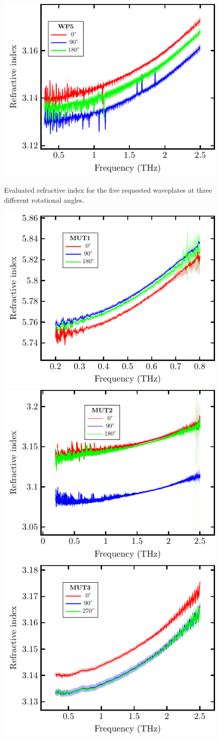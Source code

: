 \begin{figure}[H]
\subcaptionbox{\label{fig:ceramic_WP5}}
    {\includegraphics[width=0.45\linewidth]{images/7_appendix/plots/real/WP5.pdf}}
\caption{Evaluated refractive index for the five requested waveplates at three different rotational angles.}
\label{fig:ceramic_WPs}
\end{figure}

\begin{figure}[H]
\centering
\subcaptionbox{\label{fig:ceramic_MUT1}}
    {\hspace*{-2em}\includegraphics[width=0.45\linewidth]{images/7_appendix/plots/real/MUT1.pdf}}
\qquad
\subcaptionbox{\label{fig:ceramic_MUT2}}
    {\hspace*{-2em}\includegraphics[width=0.45\linewidth]{images/7_appendix/plots/real/MUT2.pdf}}
\subcaptionbox{\label{fig:ceramic_MUT3}}
    {\hspace*{-2em}\includegraphics[width=0.45\linewidth]{images/7_appendix/plots/real/MUT3.pdf}}

\end{figure}
